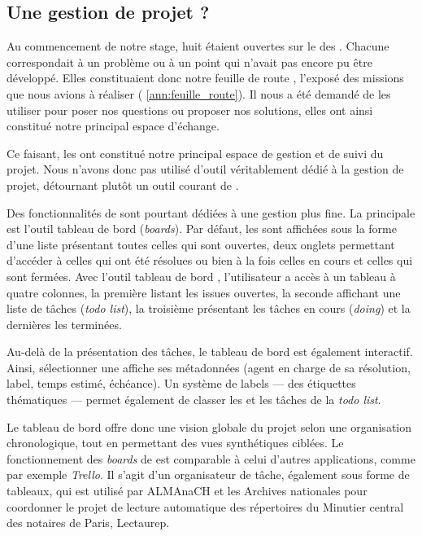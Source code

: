 \subsection{Une gestion de projet ?}

Au commencement de notre stage, huit \issues{} étaient ouvertes sur le \gitlab{} des \odm{}. Chacune correspondait à un problème ou à un point qui n'avait pas encore pu être développé. Elles constituaient donc notre \og feuille de route \fg, \cad{} l'exposé des missions que nous avions à réaliser (\ann{} \ref{ann:feuille_route}). Il nous a été demandé de les utiliser pour poser nos questions ou proposer nos solutions, elles ont ainsi constitué notre principal espace d'échange.

Ce faisant, les \issues{} ont constitué notre principal espace de gestion et de suivi du projet. Nous n'avons donc pas utilisé d'outil véritablement dédié à la gestion de projet, détournant plutôt un outil courant de \gitlab.

Des fonctionnalités de \gitlab{} sont pourtant dédiées à une gestion plus fine. La principale est l'outil \og tableau de bord \fg{} (\textit{boards}). Par défaut, les \issues{} sont affichées sous la forme d'une liste présentant toutes celles qui sont ouvertes, deux onglets permettant d'accéder à celles qui ont été résolues ou bien à la fois celles en cours et celles qui sont fermées. Avec l'outil \og tableau de bord \fg{}, l'utilisateur a accès à un tableau à quatre colonnes, la première listant les issues ouvertes, la seconde affichant une liste de tâches (\textit{todo list}), la troisième présentant les tâches en cours (\textit{doing}) et la dernières les \issues{} terminées.

Au-delà de la présentation des tâches, le tableau de bord est également interactif. Ainsi, sélectionner une \issue{} affiche ses métadonnées (agent en charge de sa résolution, label, temps estimé, échéance). Un système de labels --- des étiquettes thématiques --- permet également de classer les \issues{} et les tâches de la \textit{todo list}.

Le tableau de bord offre donc une vision globale du projet selon une organisation chronologique, tout en permettant des vues synthétiques ciblées. Le fonctionnement des \textit{boards} de \gitlab{} est comparable à celui d'autres applications, comme par exemple \textit{Trello}. Il s'agit d'un organisateur de tâche, également sous forme de tableaux, qui est utilisé par ALMAnaCH et les Archives nationales pour coordonner le projet de lecture automatique des répertoires du Minutier central des notaires de Paris, Lectaurep.

